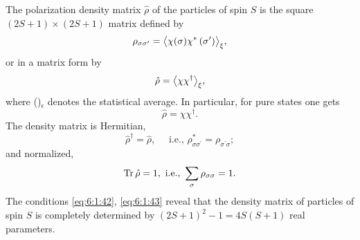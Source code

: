 The polarization density matrix $\hat{\rho}$ of the particles of spin $S$ is the square $(2 S+1) \times(2 S+1)$ matrix defined by
\begin{equation}
\rho_{\sigma \sigma^{\prime}}=\bigl\langle \chi(\sigma) \chi^{*}\left(\sigma^{\prime}\right) \bigr\rangle_{\xi} , \label{eq:6:1:39}
\end{equation}
or in a matrix form by
\begin{equation}
\hat{\rho}=\bigl\langle \chi \chi^{\dagger} \bigr\rangle_{\xi}, \label{eq:6:1:40}
\end{equation}
where ()$_{\epsilon}$ denotes the statistical average. In particular, for pure states one gets
\begin{equation}
\hat{\rho}=\chi \chi^{\dagger}. \label{eq:6:1:41}
\end{equation}
The density matrix is Hermitian,
\begin{equation}
\hat{\rho}^{\dagger}=\hat{\rho}, \quad \text { i.e., } \rho_{\sigma \sigma^{\prime}}^{*}=\rho_{\sigma^{\prime} \sigma} ; \label{eq:6:1:42}
\end{equation}
and normalized,
\begin{equation}
\operatorname{Tr}  \hat{\rho}=1, \text { i.e., } \sum_{\sigma} \rho_{\sigma \sigma}=1 . \label{eq:6:1:43}
\end{equation}
The conditions \eqref{eq:6:1:42}, \eqref{eq:6:1:43} reveal that the density matrix of particles of spin $S$ is completely determined by $(2 S+1)^{2}-1=4 S(S+1)$ real parameters.

